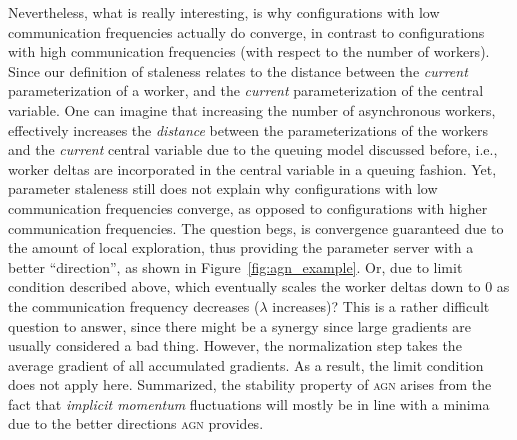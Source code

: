 \documentclass[wcp]{jmlr}
\begin{document}
Nevertheless, what is really interesting, is why configurations with low communication frequencies actually do converge, in contrast to configurations with high communication frequencies (with respect to the number of workers). Since our definition of staleness relates to the distance between the \emph{current} parameterization of a worker, and the \emph{current} parameterization of the central variable. One can imagine that increasing the number of asynchronous workers, effectively increases the \emph{distance} between the parameterizations of the workers and the \emph{current} central variable due to the queuing model discussed before, i.e., worker deltas are incorporated in the central variable in a queuing fashion. Yet, parameter staleness still does not explain why configurations with low communication frequencies converge, as opposed to configurations with higher communication frequencies. The question begs, is convergence guaranteed due to the amount of local exploration, thus providing the parameter server with a better ``direction'', as shown in Figure~\ref{fig:agn_example}. Or, due to limit condition described above, which eventually scales the worker deltas down to 0 as the communication frequency decreases ($\lambda$ increases)? This is a rather difficult question to answer, since there might be a synergy since large gradients are usually considered a bad thing. However, the normalization step takes the average gradient of all accumulated gradients. As a result, the limit condition does not apply here. Summarized, the stability property of \textsc{agn} arises from the fact that \emph{implicit momentum} fluctuations will mostly be in line with a minima due to the better directions \textsc{agn} provides.\\
\end{document}
